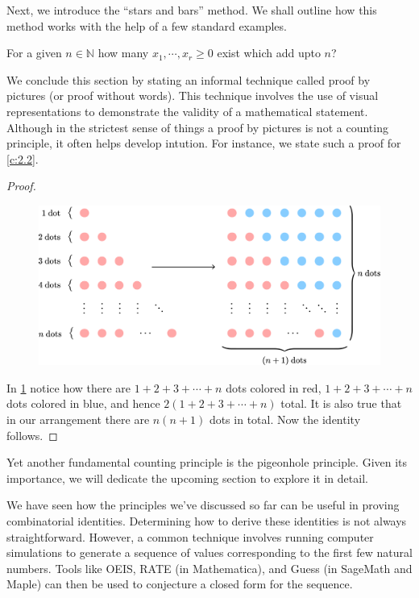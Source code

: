 Next, we introduce the ``stars and bars'' method. We shall outline how this method works with the help of a few standard examples.
\begin{question}
	For a given $n\in \mathbb{N}$ how many $x_{1},\cdots,x_{r}\geq 0$ exist which add upto $n$?
\end{question}

We conclude this section by stating an informal technique called proof by pictures (or proof without words). This technique involves the use of visual representations to demonstrate the validity of a mathematical statement. Although in the strictest sense of things a proof by pictures is not a counting principle, it often helps develop intution. For instance, we state such a proof for \cref{c:2.2}. 
\begin{proof} 
	\begin{figure}[H]
		\includegraphics[scale=0.65]{Images/Figure9.png}
		\caption{}
		\label{f:1.9}
	\end{figure}
In \cref{f:1.9} notice how there are $1+2+3+\cdots+n$ dots colored in red, $1+2+3+\cdots+n$ dots colored in blue, and hence $2\left( 1+2+3+\cdots+n \right)$ total. It is also true that in our arrangement there are $n\left( n+1 \right)$ dots in total. Now the identity follows.
\end{proof}
Yet another fundamental counting principle is the pigeonhole principle. Given its importance, we will dedicate the upcoming section to explore it in detail.
\begin{remark}
We have seen how the principles we’ve discussed so far can be useful in proving combinatorial identities. Determining how to derive these identities is not always straightforward. However, a common technique involves running computer simulations to generate a sequence of values corresponding to the first few natural numbers. Tools like OEIS, RATE (in Mathematica), and Guess (in SageMath and Maple) can then be used to conjecture a closed form for the sequence.
\end{remark}

